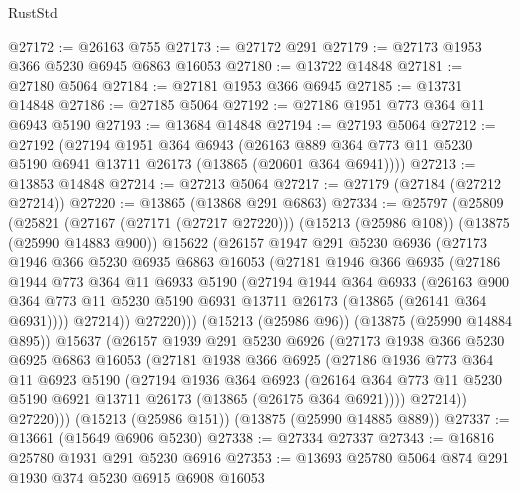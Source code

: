 \begin{lexlean}{RustStd}
\begin{coremodule}
@27172 := @26163 @755
@27173 := @27172 @291
@27179 := @27173 @1953 @366 @5230 @6945 @6863 @16053
@27180 := @13722 @14848
@27181 := @27180 @5064
@27184 := @27181 @1953 @366 @6945
@27185 := @13731 @14848
@27186 := @27185 @5064
@27192 := @27186 @1951 @773 @364 @11 @6943 @5190
@27193 := @13684 @14848
@27194 := @27193 @5064
@27212 := @27192
    (@27194
      @1951
      @364
      @6943
      (@26163 @889 @364 @773 @11 @5230 @5190 @6941 @13711 @26173 (@13865 (@20601 @364 @6941))))
@27213 := @13853 @14848
@27214 := @27213 @5064
@27217 := @27179 (@27184 (@27212 @27214))
@27220 := @13865 (@13868 @291 @6863)
@27334 := @25797
    (@25809
      (@25821
        (@27167 (@27171 (@27217 @27220)))
        (@15213 (@25986 @108))
        (@13875 (@25990 @14883 @900))
        @15622
        (@26157
          @1947
          @291
          @5230
          @6936
          (@27173
            @1946
            @366
            @5230
            @6935
            @6863
            @16053
            (@27181
              @1946
              @366
              @6935
              (@27186
                @1944
                @773
                @364
                @11
                @6933
                @5190
                (@27194
                  @1944
                  @364
                  @6933
                  (@26163
                    @900
                    @364
                    @773
                    @11
                    @5230
                    @5190
                    @6931
                    @13711
                    @26173
                    (@13865 (@26141 @364 @6931))))
                @27214))
            @27220)))
      (@15213 (@25986 @96))
      (@13875 (@25990 @14884 @895))
      @15637
      (@26157
        @1939
        @291
        @5230
        @6926
        (@27173
          @1938
          @366
          @5230
          @6925
          @6863
          @16053
          (@27181
            @1938
            @366
            @6925
            (@27186
              @1936
              @773
              @364
              @11
              @6923
              @5190
              (@27194
                @1936
                @364
                @6923
                (@26164 @364 @773 @11 @5230 @5190 @6921 @13711 @26173 (@13865 (@26175 @364 @6921))))
              @27214))
          @27220)))
    (@15213 (@25986 @151))
    (@13875 (@25990 @14885 @889))
@27337 := @13661 (@15649 @6906 @5230)
@27338 := @27334 @27337
@27343 := @16816 @25780 @1931 @291 @5230 @6916
@27353 := @13693 @25780 @5064 @874 @291 @1930 @374 @5230 @6915 @6908 @16053

\end{coremodule}
\end{lexlean}
